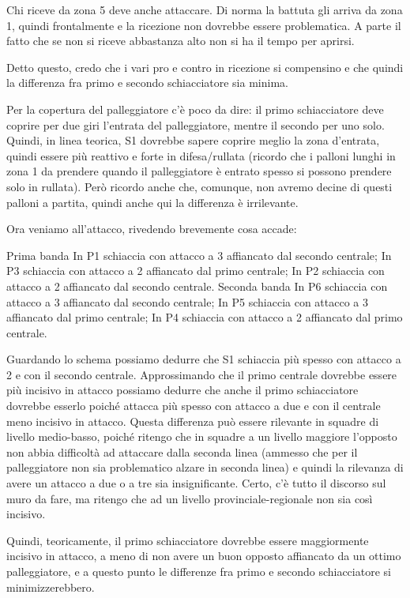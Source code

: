 \documentclass[a4paper, 12pt]{article}
\theoremstyle{remark}
\theoremstyle{definition}
\begin{document}
Chi riceve da zona 5 deve anche attaccare. Di norma la battuta gli arriva da zona 1, quindi frontalmente e la ricezione non dovrebbe essere problematica. A parte il fatto che se non si riceve abbastanza alto non si ha il tempo per aprirsi.

Detto questo, credo che i vari pro e contro in ricezione si compensino e che quindi la differenza fra primo e secondo schiacciatore sia minima.

Per la copertura del palleggiatore c’è poco da dire: il primo schiacciatore deve coprire per due giri l’entrata del palleggiatore, mentre il secondo per uno solo. Quindi, in linea teorica, S1 dovrebbe sapere coprire meglio la zona d’entrata, quindi essere più reattivo e forte in difesa/rullata (ricordo che i palloni lunghi in zona 1 da prendere quando il palleggiatore è entrato spesso si possono prendere solo in rullata). Però ricordo anche che, comunque, non avremo decine di questi palloni a partita, quindi anche qui la differenza è irrilevante.

Ora veniamo all’attacco, rivedendo brevemente cosa accade:

    Prima banda
        In P1 schiaccia con attacco a 3 affiancato dal secondo centrale;
        In P3 schiaccia con attacco a 2 affiancato dal primo centrale;
        In P2 schiaccia con attacco a 2 affiancato dal secondo centrale.
    Seconda banda
        In P6 schiaccia con attacco a 3 affiancato dal secondo centrale;
        In P5 schiaccia con attacco a 3 affiancato dal primo centrale;
        In P4 schiaccia con attacco a 2 affiancato dal primo centrale.

Guardando lo schema possiamo dedurre che S1 schiaccia più spesso con attacco a 2 e con il secondo centrale. Approssimando che il primo centrale dovrebbe essere più incisivo in attacco possiamo dedurre che anche il primo schiacciatore dovrebbe esserlo poiché attacca più spesso con attacco a due e con il centrale meno incisivo in attacco. Questa differenza può essere rilevante in squadre di livello medio-basso, poiché ritengo che in squadre a un livello maggiore l’opposto non abbia difficoltà ad attaccare dalla seconda linea (ammesso che per il palleggiatore non sia problematico alzare in seconda linea) e quindi la rilevanza di avere un attacco a due o a tre sia insignificante. Certo, c’è tutto il discorso sul muro da fare, ma ritengo che ad un livello provinciale-regionale non sia così incisivo.

Quindi, teoricamente, il primo schiacciatore dovrebbe essere maggiormente incisivo in attacco, a meno di non avere un buon opposto affiancato da un ottimo palleggiatore, e a questo punto le differenze fra primo e secondo schiacciatore si minimizzerebbero.
\end{document}
